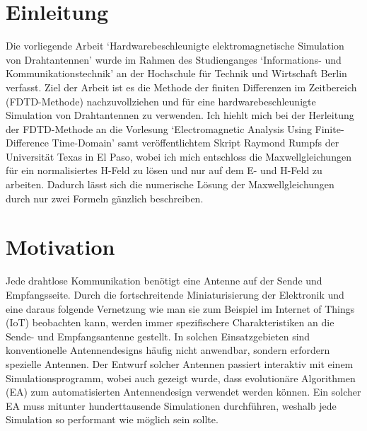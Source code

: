 \documentclass[11pt, ngerman]{article}
\begin{document}
\date{}
\maketitle
\tableofcontents
\newpage

\section{Einleitung}
Die vorliegende Arbeit `Hardwarebeschleunigte elektromagnetische Simulation von Drahtantennen'
wurde im Rahmen des Studienganges `Informations- und 
Kommunikationstechnik' an der Hochschule f\"ur Technik und Wirtschaft Berlin
verfasst. Ziel der Arbeit ist es die Methode der finiten Differenzen
im Zeitbereich (FDTD-Methode) nachzuvollziehen und f\"ur eine
hardwarebeschleunigte Simulation von Drahtantennen zu verwenden.
Ich hiehlt mich bei der Herleitung der FDTD-Methode an die Vorlesung
`Electromagnetic Analysis Using Finite-Difference Time-Domain'
samt ver\"offentlichtem Skript Raymond Rumpfs der Universit\"at
Texas in El Paso\cite{methode}, wobei ich mich entschloss die Maxwellgleichungen f\"ur
ein normalisiertes H-Feld zu l\"osen und nur auf dem E- und H-Feld zu arbeiten.
Dadurch l\"asst sich die numerische L\"osung der Maxwellgleichungen
durch nur zwei Formeln g\"anzlich beschreiben.

\section{Motivation}
Jede drahtlose Kommunikation ben\"otigt eine Antenne auf der
Sende und Empfangsseite. Durch die fortschreitende Miniaturisierung
der Elektronik und eine daraus folgende Vernetzung 
wie man sie zum Beispiel im Internet of Things (IoT)
beobachten kann, werden immer spezifischere Charakteristiken
an die Sende- und Empfangsantenne gestellt. In solchen Einsatzgebieten
sind konventionelle Antennendesigns h\"aufig nicht anwendbar,
sondern erfordern spezielle Antennen. Der Entwurf solcher Antennen
passiert interaktiv mit einem Simulationsprogramm, wobei auch
gezeigt wurde, dass evolution\"are Algorithmen (EA) zum automatisierten
Antennendesign verwendet werden k\"onnen.\cite{nasa_ea_antenna}
Ein solcher EA muss mitunter hunderttausende Simulationen durchf\"uhren\cite[p.6]{nasa_ea_antenna},
weshalb jede Simulation so performant wie m\"oglich sein sollte.
\end{document}
